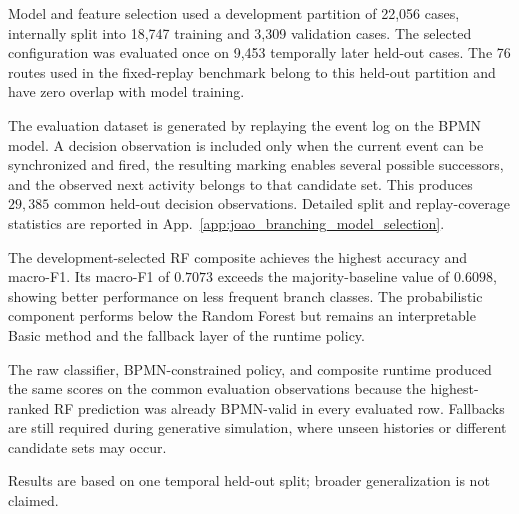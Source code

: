 Model and feature selection used a development partition of 22,056 cases, internally split into 18,747 training
and 3,309 validation cases. The selected configuration was evaluated once on 9,453 temporally later held-out
cases. The 76 routes used in the fixed-replay benchmark belong to this held-out partition and have zero overlap
with model training.

The evaluation dataset is generated by replaying the event log on the BPMN
model. A decision observation is included only when the current event can be
synchronized and fired, the resulting marking enables several possible
successors, and the observed next activity belongs to that candidate set.
This produces $29{,}385$ common held-out decision observations. Detailed split
and replay-coverage statistics are reported in
App.~\ref{app:joao_branching_model_selection}.

\begin{table}[H]
    \caption{Development-selected branching comparison on $29{,}385$ common held-out
    BPMN-replay observations.}
    \label{tab:branching_corrected_methods_joao}
    \centering
    \renewcommand{\arraystretch}{1.05}
    \scriptsize
\end{table}

The development-selected RF composite achieves the highest accuracy and macro-F1. Its
macro-F1 of $0.7073$ exceeds the majority-baseline value of $0.6098$, showing
better performance on less frequent branch classes. The probabilistic component
performs below the Random Forest but remains an interpretable Basic method and
the fallback layer of the runtime policy.

The raw classifier, BPMN-constrained policy, and composite runtime produced the
same scores on the common evaluation observations because the highest-ranked
RF prediction was already BPMN-valid in every evaluated row. Fallbacks are
still required during generative simulation, where unseen histories or
different candidate sets may occur.

Results are based on one temporal held-out split; broader generalization is not
claimed.